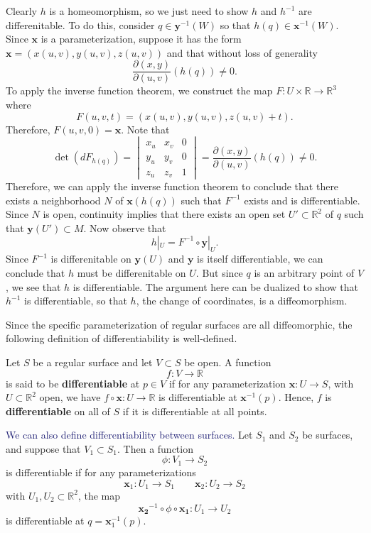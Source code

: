 \documentclass[12pt,letterpaper,boxed]{maths_v5}
\newcommand{\rr}{\mathbb{R}}
\theoremstyle{definition}
\begin{document}
\begin{prf}
    Clearly $h$ is a homeomorphism, so we just need to show $h$ and $h^{-1}$ 
    are differenitable. To do this, consider $q \in \bm{y}^{-1}(W)$ so that $h(q) \in 
    \bm{x}^{-1}(W)$. Since $\bm{x}$ is a parameterization,
    suppose it has the form $\bm{x} = (x(u, v), y(u, v), z(u, v))$ and that without 
    loss of generality
    \[
        \frac{\partial(x, y)}{\partial(u, v)}(h(q)) \ne 0. 
    \]
    To apply the inverse function theorem, we construct the map $F: U \times \rr \to \rr^3$ 
    where 
    \[
        F(u, v, t) = (x(u,v), y(u,v), z(u,v) + t).
    \]
    Therefore, $F(u, v, 0) = \bm{x}$. Note that 
    \[
        \det(dF_{h(q)})
        =
        \begin{vmatrix}
            x_u & x_v & 0 \\
            y_u & y_v & 0 \\
            z_u &z_v & 1
        \end{vmatrix}
        = 
        \frac{\partial(x, y)}{\partial(u, v)}(h(q)) \ne 0.
    \] 
    Therefore, we can apply the inverse function theorem to conclude that 
    there exists a neighborhood $N$ of $\bm{x}(h(q))$ such that $F^{-1}$ 
    exists and is differentiable. Since $N$ is open, continuity implies 
    that there exists an open set $U' \subset \rr^2$ of $q$ such that 
    $\bm{y}(U') \subset M$. Now observe that 
    \[
        h|_U = F^{-1} \circ \bm{y}|_U.
    \]
    Since $F^{-1}$ is differenitable on $\bm{y}(U)$ and $\bm{y}$ is itself
    differentiable, we can conclude that $h$ must be differenitable on $U$. But 
    since $q$ is an arbitrary point of $V$, we see that $h$ is differentiable. 
    The argument here can be dualized to show that $h^{-1}$ is differentiable, 
    so that $h$, the change of coordinates, is a diffeomorphism. 
\end{prf}

Since the specific parameterization of regular surfaces are all diffeomorphic, 
the following definition of differentiability is well-defined. 

\begin{defn}
    Let $S$ be a regular surface and let $V \subset S$ be open. 
    A function 
    \[
        f: V \to \rr  
    \]
    is said to be \textbf{differentiable} 
    at $p \in V$ if for any parameterization $\bm{x}: U \to S$, with $U \subset \rr^2$ open, 
    we have $f \circ \bm{x}: U \to \rr$ is differentiable at $\bm{x}^{-1}(p)$. 
    Hence, $f$ is \textbf{differentiable} on all of $S$ if it is differentiable 
    at all points.

    \textcolor{MidnightBlue}{We can also define differentiability between surfaces.}
    Let $S_1$ and $S_2$ be surfaces, and suppose that 
    $V_1 \subset S_1$. Then a function 
    \[
        \phi: V_1 \to S_2 
    \]
    is differentiable if for any parameterizations 
    \[
        \bm{x}_1: U_1 \to S_1 \qquad \bm{x}_2: U_2 \to S_2
    \]
    with $U_1, U_2 \subset \rr^2$, the map 
    \[
        \bm{x_2}^{-1}\circ \phi \circ \bm{x_1}: U_1 \to U_2
    \]
    is differentiable at $q = \bm{x}_1^{-1}(p)$.
\end{defn}
\end{document}
